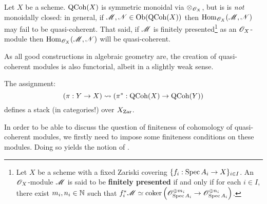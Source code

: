             \begin{proposition} \label{prop: qcoh_monoidal_properties}
                Let $X$ be a scheme. $\mathrm{QCoh}(X)$ is symmetric monoidal via $\tensor_{\scrO_X}$, but is is \textit{not} monoidally closed: in general, if $\mathscr{M}, \mathscr{N} \in \mathrm{Ob}(\mathrm{QCoh}(X))$ then $\mathrm{Hom}_{\mathscr{O}_X}(\mathscr{M}, \mathscr{N})$ may fail to be quasi-coherent. That said, if $\mathscr{M}$ is finitely presented\footnote{Let $X$ be a scheme with a fixed Zariski covering $\{ f_i: \operatorname{Spec} A_i \to X \}_{i \in I}$. An $\mathscr{O}_X$-module $\mathscr{M}$ is said to be \textbf{finitely presented} if and only if for each $i \in I$, there exist $m_i, n_i \in \mathbb{N}$ such that $f_i^*\mathscr{M} \simeq \operatorname{coker}\left( \mathscr{O}_{\operatorname{Spec} A_i}^{\oplus m_i} \to \mathscr{O}_{\operatorname{Spec} A_i}^{\oplus n_i} \right)$.} as an $\mathscr{O}_X$-module then $\mathrm{Hom}_{\mathscr{O}_X}(\mathscr{M}, \mathscr{N})$ will be quasi-coherent. 
            \end{proposition}
            As all good constructions in algebraic geometry are, the creation of quasi-coherent modules is also functorial, albeit in a slightly weak sense. 
            \begin{proposition} \label{prop: qcoh_functoriality}
                The assignment:
                    $$(\pi: Y \to X) \leadsto ( \pi^*: \mathrm{QCoh}(X) \to \mathrm{QCoh}(Y) )$$
                defines a stack (in categories!) over $X_{\mathrm{Zar}}$. 
            \end{proposition}

            In order to be able to discuss the question of finiteness of cohomology of quasi-coherent modules, we firstly need to impose some finiteness conditions on these modules. Doing so yields the notion of .
        

